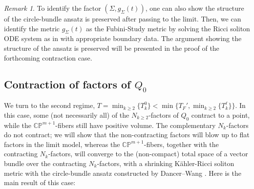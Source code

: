 \documentclass[11pt]{amsart}
\theoremstyle{plain}
\numberwithin{equation}{section}
\theoremstyle{definition}
\theoremstyle{remark}
\newtheorem*{remarkx}{Remark}
\begin{document}
\begin{remarkx}
To identify the factor $(\Sigma,g_\Sigma(t))$, one can also show the structure of the circle-bundle ansatz is preserved after passing to the limit. Then, we can identify the metric $g_\Sigma(t)$ as the Fubini-Study metric by solving the Ricci soliton ODE system as in \cite{DW2011} with appropriate boundary data. The argument showing the structure of the ansatz is preserved will be presented in the proof of the forthcoming contraction case.
\end{remarkx}


\subsection{Contraction of factors of $Q_0$}

We turn to the second regime, $T = \min_{k \geq 2}\{T_k^0\} < \min\big\{T_F', \min_{k\geq 2}\{T_k^\ell\}\big\}$. In this case, some (not necessarily all) of the $N_{k \geq 2}$-factors of $Q_0$ contract to a point, while the $\mathbb{CP}^{m+1}$-fibers still have positive volume. The complementary $N_k$-factors do not contract; we will show that the non-contracting factors will blow up to flat factors in the limit model, whereas the $\mathbb{CP}^{m+1}$-fibers, together with the contracting $N_k$-factors, will converge to the (non-compact) total space of a vector bundle over the contracting $N_k$-factors, with a shrinking K\"ahler-Ricci soliton metric with the circle-bundle ansatz constructed by Dancer--Wang \cite{DW2011}. Here is the main result of this case:
\end{document}
